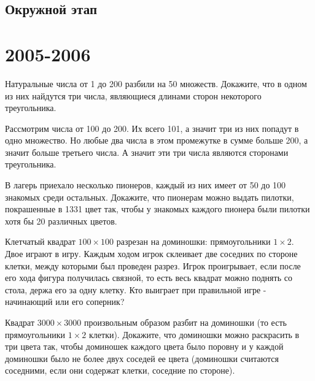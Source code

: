 \documentclass[11pt, a4paper]{common/document_template}
\begin{document}
\begin{Solution}
\end{Solution}

\section{Окружной этап}

\chapter{2005-2006}

\begin{exercise}
Натуральные числа от 1 до 200 разбили на 50 множеств. Докажите, что в одном из них найдутся три числа, являющиеся длинами сторон некоторого треугольника.
\end{exercise}

\begin{Solution}
Рассмотрим числа от 100 до 200. Их всего 101, а значит три из них попадут в одно множество. Но любые два числа в этом промежутке в сумме больше 200, а значит больше третьего числа. А значит эти три числа являются сторонами треугольника.
\end{Solution}

\begin{exercise}
В лагерь приехало несколько пионеров, каждый из них имеет от 50 до 100 знакомых среди остальных. Докажите, что пионерам можно выдать пилотки, покрашенные в 1331 цвет так, чтобы у знакомых каждого пионера были пилотки хотя бы 20 различных цветов. 
\end{exercise}

\begin{exercise}
Клетчатый квадрат $100 \times 100$ разрезан на доминошки: прямоугольники $1 \times 2$. Двое играют в игру. Каждым ходом игрок склеивает две соседних по стороне клетки, между которыми был проведен разрез. Игрок
проигрывает, если после его хода фигура получилась связной, то есть весь
квадрат можно поднять со стола, держа его за одну клетку. Кто выиграет
при правильной игре - начинающий или его соперник?
\end{exercise}

\begin{exercise}
Квадрат $3000 \times 3000$ произвольным образом разбит на доминошки
(то есть прямоугольники $1 \times 2$ клетки). Докажите, что доминошки можно раскрасить в три цвета так, чтобы доминошек каждого цвета было поровну и у каждой доминошки было не более двух соседей ее цвета (доминошки считаются соседними, если они содержат клетки, соседние по стороне).
\end{exercise}
\end{document}
